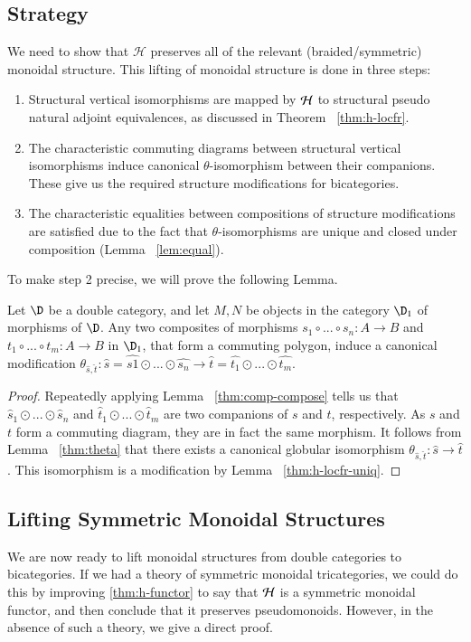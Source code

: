 \documentclass{amsart}
\begin{document}
\subsection{Strategy}
We need to show that $\mathcal{H}$ preserves all of the relevant (braided/symmetric) monoidal structure.
This lifting of monoidal structure is done in three steps:
\begin{enumerate}
\item Structural vertical isomorphisms are mapped by $\mathcal{H}$ to structural pseudo natural adjoint equivalences, as discussed in Theorem ~\ref{thm:h-locfr}.
\item The characteristic commuting diagrams between structural vertical isomorphisms induce canonical $\theta$-isomorphism between their companions. These give us the required structure modifications for bicategories.
\item The characteristic equalities between compositions of structure modifications are satisfied due to the fact that $\theta$-isomorphisms are unique and closed under composition (Lemma ~\ref{lem:equal}).
\end{enumerate}

To make step 2 precise, we will prove the following Lemma.

\begin{lem}\label{lem:modification}
Let $\D$ be a double category, and let $M,N$ be objects in the category $\D_1$ of morphisms of $\D$. Any two composites of morphisms $s_1 \circ ... \circ s_n:A \rightarrow B$ and $t_1 \circ ... \circ t_m: A \rightarrow B$ in $\D_1$, that form a commuting polygon, induce a canonical modification $\theta_{\hat{s},\hat{t}} : \hat{s} = \hat{s1} \odot ... \odot \hat{s_n} \rightarrow \hat{t} = \hat{t_1} \odot ... \odot \hat{t_m}$. 
\end{lem}

\begin{proof}
Repeatedly applying Lemma ~\ref{thm:comp-compose} tells us that $\hat{s}_1 \odot ... \odot \hat{s}_n$ and $\hat{t}_1 \odot ... \odot \hat{t}_m$ are two companions of $s$ and $t$, respectively. As $s$ and $t$ form a commuting diagram, they are in fact the same morphism. It follows from Lemma ~\ref{thm:theta} that there exists a canonical globular isomorphism $\theta_{\hat{s},\hat{t}}: \hat{s} \rightarrow \hat{t}$. This isomorphism is a modification by Lemma ~\ref{thm:h-locfr-uniq}.
\end{proof}
  

\subsection{Lifting Symmetric Monoidal Structures}
We are now ready to lift monoidal structures from double categories to
bicategories.  If we had a theory of symmetric monoidal tricategories,
we could do this by improving \autoref{thm:h-functor} to say that
$\mathcal{H}$ is a symmetric monoidal functor, and then conclude that it
preserves pseudomonoids.  However, in the absence of such a theory, we
give a direct proof.
\end{document}

